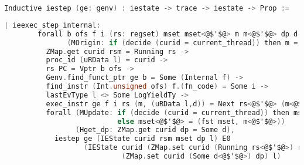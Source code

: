 \begin{lstlisting}[language=C]
  Inductive iestep (ge: genv) : iestate -> trace -> iestate -> Prop :=
\end{lstlisting}


\begin{lstlisting}[language=C]
    | ieexec_step_internal:
        forall b ofs f i (rs: regset) mset mset<@$'$@> m m<@$'$@> dp d d<@$'$@> ds<@$'$@> rs<@$'$@> curid rsm l
               (MOrigin: if (decide (curid = current_thread)) then m = fst mset else m = snd mset),
          ZMap.get curid rsm = Running rs ->
          proc_id (uRData l) = curid ->
          rs PC = Vptr b ofs ->
          Genv.find_funct_ptr ge b = Some (Internal f) ->
          find_instr (Int.unsigned ofs) f.(fn_code) = Some i ->
          lastEvType l <> Some LogYieldTy ->
          exec_instr ge f i rs (m, (uRData l,d)) = Next rs<@$'$@> (m<@$'$@>, (ds<@$'$@>,d<@$'$@>)) ->
          forall (MUpdate: if (decide (curid = current_thread)) then mset<@$'$@> = (m<@$'$@>, snd mset)
                           else mset<@$'$@> = (fst mset, m<@$'$@>))
                 (Hget_dp: ZMap.get curid dp = Some d),
            iestep ge (IEState curid rsm mset dp l) E0
                   (IEState curid (ZMap.set curid (Running rs<@$'$@>) rsm) mset<@$'$@> 
                            (ZMap.set curid (Some d<@$'$@>) dp) l)
\end{lstlisting}


